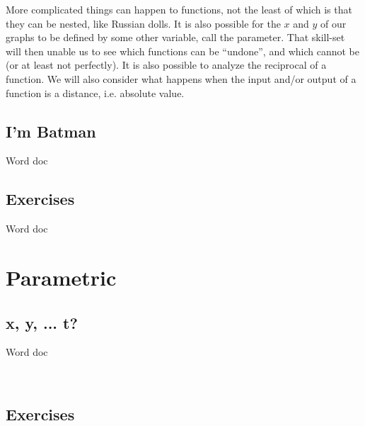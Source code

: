 

More complicated things can happen to functions, not the least of which is that they can be nested, 
like Russian dolls.  It is also possible for the $x$ and $y$ of our graphs to be defined by some
other variable, call the parameter.  That skill-set will then unable us to see which functions can
be ``undone'', and which cannot be (or at least not perfectly).  It is also possible 
to analyze the reciprocal of a function.   We will also consider what happens 
when the input and/or output of a function is a distance, i.e. absolute value.


\newpage
\chapterminitoc

\newpage
{}
\subsection{I'm Batman}
Word doc
\newpage

\newpage
\subsection{Exercises}
Word doc



\newpage
\section{Parametric}
\subsection{x, y, ... t?}
Word doc
\newpage

~\vfill
\subsection{Exercises}
\noindent{}
\newpage
\noindent{}
\newpage
\noindent{}
\newpage
\noindent{}



